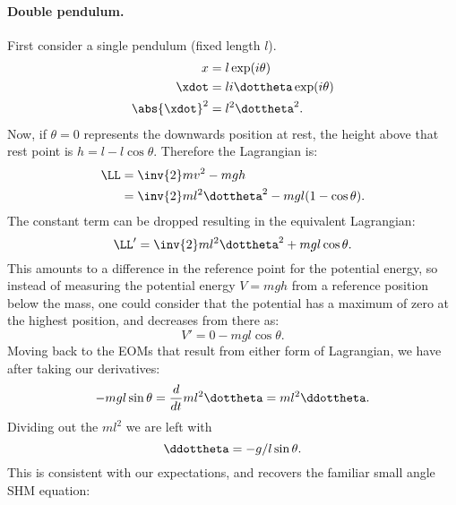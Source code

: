 {\paragraph{Double pendulum.}
%
First consider a single pendulum (fixed length \(l\)).
%
\begin{equation}\label{eqn:tongMf1:360}
\begin{aligned}
x &= l \exp(i\theta) \\
\xdot &= l i \dottheta \exp(i\theta) \\
\abs{\xdot}^2 &= l^2 \dottheta^2 .
\end{aligned}
\end{equation}
%
Now, if \(\theta = 0\) represents the downwards position at rest, the height above that rest point is \(h = l - l \cos\theta\).  Therefore the Lagrangian is:
%
\begin{equation}\label{eqn:tongMf1:380}
\begin{aligned}
\LL
&= \inv{2} m v^2 - mgh \\
&= \inv{2} m l^2 \dottheta^2 - mg l (1 - \cos\theta) .
\end{aligned}
\end{equation}
%
The constant term can be dropped resulting in the equivalent Lagrangian:
%
\begin{equation}\label{eqn:tongMf1:1300}
\LL' = \inv{2} m l^2 \dottheta^2 + mg l \cos\theta.
\end{equation}
%
This amounts to a difference in the reference point for the potential energy, so
instead of measuring the potential energy \(V = m g h\) from a reference position below the mass, one could consider that the potential has a maximum of zero at the highest position, and decreases from there as:
%
\begin{equation}\label{eqn:tongMf1:1320}
V' = 0 - m g l \cos\theta.
\end{equation}
%
Moving back to the EOMs that result from either form of Lagrangian, we have after taking our derivatives:
%
\begin{equation}\label{eqn:tongMf1:1340}
-m g l \sin\theta = \frac{d}{dt} m l^2 \dottheta = m l^2 \ddottheta.
\end{equation}
%
Dividing out the \( m l^2 \) we are left with
%
\begin{equation}\label{eqn:tongMf1:1360}
\ddottheta = - g/l \sin\theta.
\end{equation}
%
This is consistent with our expectations, and recovers the familiar small angle SHM equation:
%
\begin{equation}\label{eqn:tongMf1:1380}

\end{equation}}
